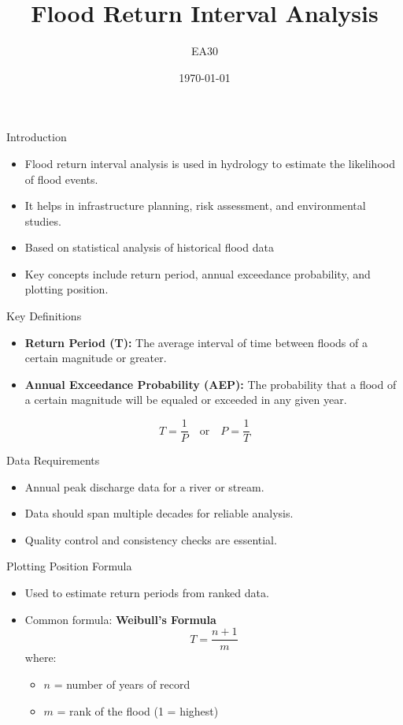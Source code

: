 \documentclass{beamer}
\title{Flood Return Interval Analysis}
\author{EA30}
\date{\today}
\begin{document}
\frame{\titlepage}

\begin{frame}{Introduction}
\begin{itemize}
\item Flood return interval analysis is used in hydrology to estimate the likelihood of flood events.
\item It helps in infrastructure planning, risk assessment, and environmental studies.
\item Based on statistical analysis of historical flood data
\item Key concepts include return period, annual exceedance probability, and plotting position.
\end{itemize}
\end{frame}

\begin{frame}{Key Definitions}
\begin{itemize}
\item \textbf{Return Period (T):} The average interval of time between floods of a certain magnitude or greater.
\item \textbf{Annual Exceedance Probability (AEP):} The probability that a flood of a certain magnitude will be equaled or exceeded in any given year.
\end{itemize}
\vspace{0.5cm}
\[
  T = \frac{1}{P}
  \quad \text{or} \quad
  P = \frac{1}{T}
  \]
\end{frame}

\begin{frame}{Data Requirements}
\begin{itemize}
\item Annual peak discharge data for a river or stream.
\item Data should span multiple decades for reliable analysis.
\item Quality control and consistency checks are essential.
\end{itemize}
\end{frame}

\begin{frame}{Plotting Position Formula}
\begin{itemize}
\item Used to estimate return periods from ranked data.
\item Common formula: \textbf{Weibull's Formula}
        \[
        T = \frac{n+1}{m}
        \]
        where:
        \begin{itemize}
            \item $n$ = number of years of record
            \item $m$ = rank of the flood (1 = highest)
        \end{itemize}
    \end{itemize}
\end{frame}
\end{document}

